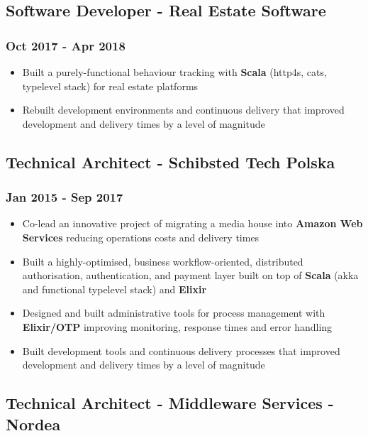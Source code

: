 \documentclass[11pt]{article}
\begin{document}
\subsection*{Software Developer - Real Estate Software}
\label{sec:org94bb4ac}
\subsubsection*{Oct 2017 - Apr 2018}
\label{sec:org2f7175a}
\begin{itemize}
\item Built a purely-functional behaviour tracking with \textbf{Scala} (http4s, cats, typelevel stack) for real estate platforms
\item Rebuilt development environments and continuous delivery that improved development and delivery times by a level of magnitude
\end{itemize}

\subsection*{Technical Architect - Schibsted Tech Polska}
\label{sec:org7fa3a4e}
\subsubsection*{Jan 2015 - Sep 2017}
\label{sec:org1465f14}
\begin{itemize}
\item Co-lead an innovative project of migrating a media house into \textbf{Amazon Web Services} reducing operations costs and delivery times
\item Built a highly-optimised, business workflow-oriented, distributed authorisation, authentication, and payment layer built on top of \textbf{Scala} (akka and functional typelevel stack) and \textbf{Elixir}
\item Designed and built administrative tools for process management with \textbf{Elixir/OTP} improving monitoring, response times and error handling
\item Built development tools and continuous delivery processes that improved development and delivery times by a level of magnitude
\end{itemize}

\subsection*{Technical Architect - Middleware Services - Nordea}
\label{sec:org44c0bf6}
\end{document}
